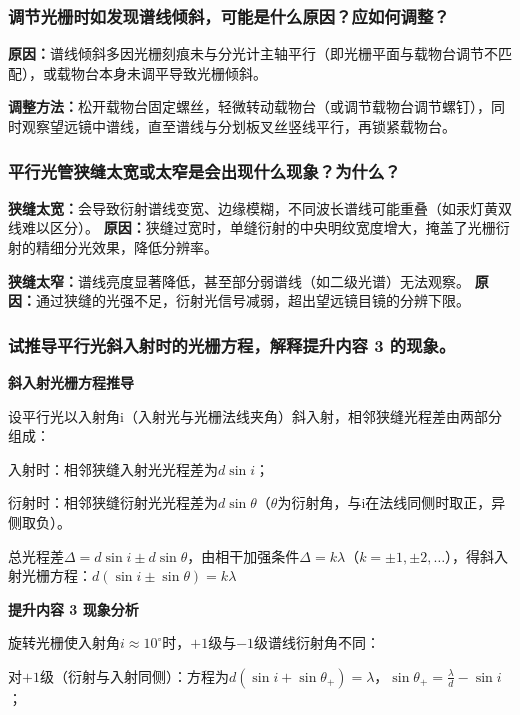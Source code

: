 \documentclass[10pt,a4paper]{ctexart}
\begin{document}
    \subsubsection*{调节光栅时如发现谱线倾斜，可能是什么原因？应如何调整？}

    \textbf{原因：}谱线倾斜多因光栅刻痕未与分光计主轴平行（即光栅平面与载物台调节不匹配），或载物台本身未调平导致光栅倾斜。
    
    \textbf{调整方法：}松开载物台固定螺丝，轻微转动载物台（或调节载物台调节螺钉），同时观察望远镜中谱线，直至谱线与分划板叉丝竖线平行，再锁紧载物台。

    \subsubsection*{平行光管狭缝太宽或太窄是会出现什么现象？为什么？}

    \textbf{狭缝太宽：}会导致衍射谱线变宽、边缘模糊，不同波长谱线可能重叠（如汞灯黄双线难以区分）。
    \textbf{原因：}狭缝过宽时，单缝衍射的中央明纹宽度增大，掩盖了光栅衍射的精细分光效果，降低分辨率。

    \textbf{狭缝太窄：}谱线亮度显著降低，甚至部分弱谱线（如二级光谱）无法观察。
    \textbf{原因：}通过狭缝的光强不足，衍射光信号减弱，超出望远镜目镜的分辨下限。

    \subsubsection*{试推导平行光斜入射时的光栅方程，解释提升内容 3 的现象。}

    \textbf{斜入射光栅方程推导}

    设平行光以入射角i（入射光与光栅法线夹角）斜入射，相邻狭缝光程差由两部分组成：
    
    入射时：相邻狭缝入射光光程差为\(d\sin i\)；
    
    衍射时：相邻狭缝衍射光光程差为\(d\sin\theta\)（\(\theta\)为衍射角，与i在法线同侧时取正，异侧取负）。
    
    总光程差\(\Delta = d\sin i \pm d\sin\theta\)，由相干加强条件\(\Delta = k\lambda\)（\(k=\pm1,\pm2,\dots\)），得斜入射光栅方程：\(d(\sin i \pm \sin\theta) = k\lambda\)
    
    \textbf{ 提升内容 3 现象分析}
    
    旋转光栅使入射角\(i\approx10^\circ\)时，\(+1\)级与\(-1\)级谱线衍射角不同：
    
    对\(+1\)级（衍射与入射同侧）：方程为\(d(\sin i + \sin\theta_+) = \lambda\)，\(\sin\theta_+ = \frac{\lambda}{d} - \sin i\)；
    
\end{document}
